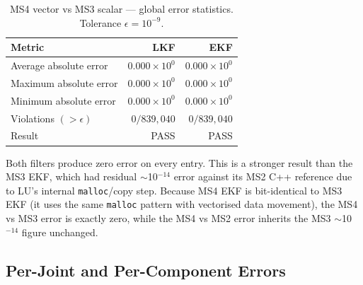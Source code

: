 \documentclass[11pt,a4paper]{article}
\begin{document}
\begin{table}[h]
\centering
\caption{MS4 vector vs MS3 scalar --- global error statistics. Tolerance
$\epsilon = 10^{-9}$.}
\begin{tabular}{lrr}
\toprule
Metric                  & LKF                & EKF                \\
\midrule
Average absolute error  & $0.000 \times 10^0$ & $0.000 \times 10^0$ \\
Maximum absolute error  & $0.000 \times 10^0$ & $0.000 \times 10^0$ \\
Minimum absolute error  & $0.000 \times 10^0$ & $0.000 \times 10^0$ \\
Violations $(>\epsilon)$ & $0 / 839{,}040$    & $0 / 839{,}040$    \\
Result                  & PASS               & PASS               \\
\bottomrule
\end{tabular}
\end{table}

Both filters produce zero error on every entry. This is a stronger result
than the MS3 EKF, which had residual $\sim$10$^{-14}$ error against its
MS2 C++ reference due to LU's internal \texttt{malloc}/copy step. Because
MS4 EKF is bit-identical to MS3 EKF (it uses the same \texttt{malloc}
pattern with vectorised data movement), the MS4 vs MS3 error is exactly
zero, while the MS4 vs MS2 error inherits the MS3 $\sim$10$^{-14}$ figure
unchanged.

\subsection{Per-Joint and Per-Component Errors}
\end{document}
